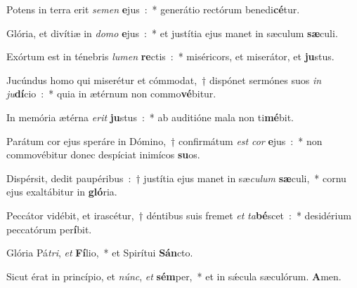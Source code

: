 ﻿\item Potens in terra erit\emph{ se}\-\emph{men}\-\textbf{ e}\-jus~:~* generátio rectórum benedi\textbf{cé}tur.
\item Glória, et divítiæ in\emph{ do}\-\emph{mo}\-\textbf{ e}\-jus~:~* et justítia ejus manet in sæculum\textbf{ sæ}culi.
\item Exórtum est in ténebris\emph{ lu}\-\emph{men}\-\textbf{ re}\-ctis~:~* miséricors, et miserátor, et\textbf{ ju}stus.
\item Jucúndus homo qui miserétur et cómmodat,~† dispónet sermónes suos\emph{ in}\-\emph{ ju}\-\textbf{dí}\-cio~:~* quia in ætérnum non commo\textbf{vé}bitur.
\item In memória ætérna\emph{ e}\-\emph{rit}\-\textbf{ ju}\-stus~:~* ab auditióne mala non ti\textbf{mé}bit.
\item Parátum cor ejus speráre in Dómino,~† confirmátum\emph{ est}\-\emph{ cor}\-\textbf{ e}\-jus~:~* non commovébitur donec despíciat inimícos\textbf{ su}os.
\item Dispérsit, dedit paupéribus~:~† justítia ejus manet in sæ\emph{cu}\-\emph{lum}\-\textbf{ sæ}\-culi,~* cornu ejus exaltábitur in\textbf{ gló}ria.
\item Peccátor vidébit, et irascétur,~† déntibus suis fremet\emph{ et}\-\emph{ ta}\-\textbf{bé}\-scet~:~* desidérium peccatórum per\textbf{í}bit.
\item Glória Pá\emph{tri},\emph{ et}\-\textbf{ Fí}\-lio,~* et Spirítui\textbf{ Sán}cto.
\item Sicut érat in princípio, et\emph{ núnc},\emph{ et}\-\textbf{ sém}\-per,~* et in sǽcula sæculórum.\textbf{ A}men.